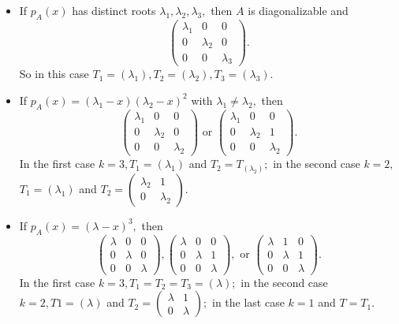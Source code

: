 \documentclass[12pt, a4paper]{article}
\theoremstyle{definition}
\theoremstyle{plain}
\begin{document}
\begin{itemize}

	\item If $p_A(x)$ has distinct roots $\lambda_1, \lambda_2, \lambda_3,$ then $A$ is diagonalizable and $$\begin{pmatrix} \lambda_1 &0&0 \\0&\lambda_2&0 \\ 0&0&\lambda_3 \end{pmatrix}.$$ So in this case $T_1=(\lambda_1),T_2=(\lambda_2),T_3=(\lambda_3).$

	\item If $p_A(x) = (\lambda_1 -x)(\lambda_2 -x)^2$ with $\lambda_1 \neq \lambda_2,$ then $$\begin{pmatrix} \lambda_1 &0&0 \\0&\lambda_2&0 \\ 0&0&\lambda_2 \end{pmatrix} \text{ or } \begin{pmatrix} \lambda_1 &0&0 \\0&\lambda_2&1 \\ 0&0&\lambda_2 \end{pmatrix}.$$ In the first case $k=3, T_1=(\lambda_1)$ and $T_2=T_(\lambda_2);$ in the second case $k=2,$ $T_1=(\lambda_1)$ and $T_2=\begin{pmatrix} \lambda_2 & 1 \\ 0 & \lambda_2 \end{pmatrix}.$

	\item If $p_A(x)=(\lambda-x)^3,$ then $$\begin{pmatrix} \lambda &0&0 \\0&\lambda&0 \\ 0&0&\lambda \end{pmatrix},\begin{pmatrix} \lambda &0&0 \\0&\lambda&1 \\ 0&0&\lambda \end{pmatrix}, \text{ or } \begin{pmatrix} \lambda &1&0 \\0&\lambda&1 \\ 0&0&\lambda \end{pmatrix}.$$In the first case $k = 3, T_1 = T_2 = T_3 = (\lambda);$ in the second case $k = 2, T1 = (\lambda)$ and $T_2= \begin{pmatrix} \lambda & 1 \\ 0&\lambda \end{pmatrix};$ in the last case $k=1$ and $T=T_1.$

\end{itemize}
\end{document}

